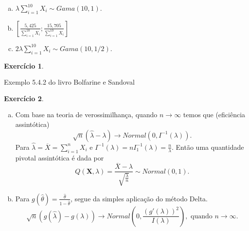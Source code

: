\documentclass[letter,11pt]{article}
\newtheorem{exer}{Exercício}
\begin{document}
\begin{enumerate}[a)]
\item $\lambda\sum_{i=1}^{10} X_i \sim Gama(10,1)$.

\item $\left[\frac{5,425}{\sum_{i=1}^{10} X_i} ; \frac{15,705}{\sum_{i=1}^{10} X_i}\right]$

\item $2\lambda\sum_{i=1}^{10} X_i \sim Gama(10,1/2)$.
\end{enumerate}


\begin{exer} \rm
\end{exer}
Exemplo 5.4.2 do livro Bolfarine e Sandoval

\begin{exer} \rm
\end{exer}

\begin{enumerate}[a)]
   \item Com base na teoria de verossimilhança, quando $n \rightarrow \infty$ 
   temos que (eficiência assintótica) 
   $$ \sqrt n (\hat \lambda - \lambda) \rightarrow Normal \left( 0, I^{-1}(\lambda) \right).$$
   Para $\hat \lambda = \overline X = \sum_{i=1}^n X_i$ e $I^{-1}(\lambda) = 
   nI^{-1}_1(\lambda) = \frac{n}{\lambda}$. Então uma quantidade pivotal 
   assintótica é dada por 
   $$ Q(\boldsymbol{X}, \lambda) = \frac{\overline X - \lambda}{\sqrt{\frac{\lambda}{n}}} \sim Normal(0,1).$$
   
    \item Para $g(\hat{\theta})=\frac{\hat{\theta}}{1-\hat{\theta}}$, segue da 
    simples aplicação do método Delta.
    $$\sqrt n \left( g(\hat \lambda) - g(\lambda) \right) \rightarrow Normal \left( 0, \frac{(g'(\lambda))^2}{I(\lambda)} \right), \text{ quando } n \rightarrow \infty.$$
\end{enumerate}
\end{document}
